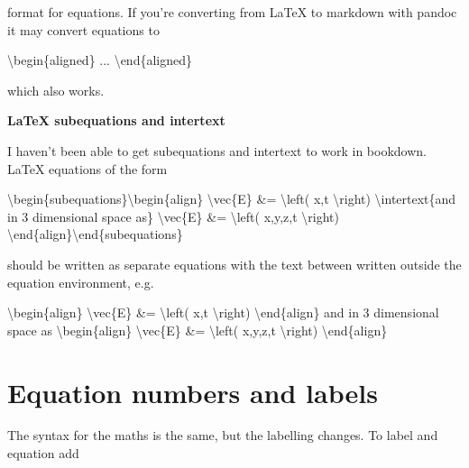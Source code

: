 \documentclass[
]{book}
\newenvironment{Shaded}{\begin{snugshade}}{\end{snugshade}}
\newcommand{\NormalTok}[1]{#1}
\begin{document}
format for equations. If you're converting from LaTeX to markdown with pandoc it may convert equations to

\begin{Shaded}
\begin{Highlighting}[]
\NormalTok{\textbackslash{}begin\{aligned\}}
\NormalTok{...}
\NormalTok{\textbackslash{}end\{aligned\}}
\end{Highlighting}
\end{Shaded}

which also works.

\textbf{LaTeX subequations and intertext}

I haven't been able to get subequations and intertext to work in bookdown. LaTeX equations of the form

\begin{Shaded}
\begin{Highlighting}[]
\NormalTok{\textbackslash{}begin\{subequations\}\textbackslash{}begin\{align\}}
\NormalTok{\textbackslash{}vec\{E\} \&= \textbackslash{}left( x,t \textbackslash{}right)}
\NormalTok{\textbackslash{}intertext\{and in 3 dimensional space as\}}
\NormalTok{\textbackslash{}vec\{E\} \&= \textbackslash{}left( x,y,z,t \textbackslash{}right)}
\NormalTok{\textbackslash{}end\{align\}\textbackslash{}end\{subequations\}}
\end{Highlighting}
\end{Shaded}

should be written as separate equations with the text between written outside the equation environment, e.g.~

\begin{Shaded}
\begin{Highlighting}[]
\NormalTok{\textbackslash{}begin\{align\}}
\NormalTok{\textbackslash{}vec\{E\} \&= \textbackslash{}left( x,t \textbackslash{}right)}
\NormalTok{\textbackslash{}end\{align\}}
\NormalTok{and in 3 dimensional space as}
\NormalTok{\textbackslash{}begin\{align\}}
\NormalTok{\textbackslash{}vec\{E\} \&= \textbackslash{}left( x,y,z,t \textbackslash{}right)}
\NormalTok{\textbackslash{}end\{align\}}
\end{Highlighting}
\end{Shaded}

\section{Equation numbers and labels}\label{sec:eq-nos-labels}

The syntax for the maths is the same, but the labelling changes. To label and equation add
\end{document}
